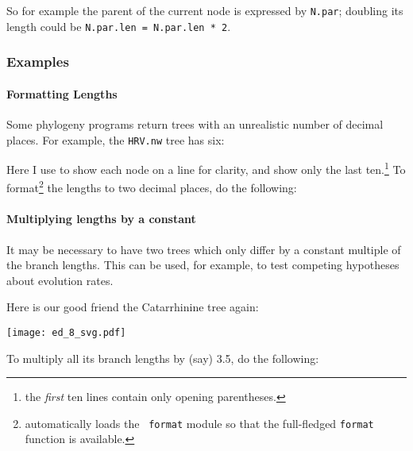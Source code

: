 \noindent{}So for example the parent of the current node is expressed by
\texttt{N.par}; doubling its length could be \texttt{N.par.len = N.par.len * 2}.

\subsubsection{Examples}

\paragraph{Formatting Lengths} 

\noindent{}Some phylogeny programs return \nw{} trees with an unrealistic number
of decimal places. For example, the \texttt{HRV.nw} tree has six:


\begin{samepage}

\end{samepage}

\noindent{}Here I use \nwindent{} to show each node on a line for clarity, and
show only the last ten.\footnote{the \emph{first} ten lines contain only
opening parentheses.} To format\footnote{\sched{} automatically loads the {\tt
format} module so that the full-fledged {\tt format} function is available.}
the lengths to two decimal places, do the following:


\begin{samepage}

\end{samepage}

\begin{samepage}
\paragraph{Multiplying lengths by a constant}

It may be necessary to have two trees which only differ by a constant multiple
of the branch lengths. This can be used, for example, to test competing
hypotheses about evolution rates.
\end{samepage}
Here is our good friend the Catarrhinine tree again:


\begin{center}
\texttt{[image: ed\_8\_svg.pdf]}
\end{center}

To multiply all its branch lengths by (say) 3.5, do the following:

